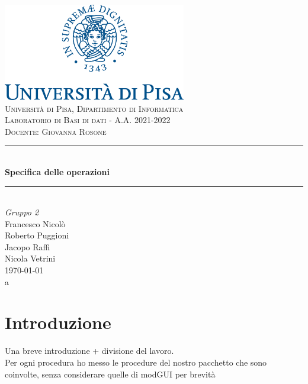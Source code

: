 \documentclass[a4paper,11pt]{article}
\newcommand{\HRule}{\rule{\linewidth}{0.5mm}} 	%
\begin{document}
\begin{titlepage}
\center
\includegraphics[width=0.6\textwidth]{img/unipi-logo.png}\\[1cm]

\textsc{\LARGE Università di Pisa, Dipartimento di Informatica}\\[1cm]

\textsc{\Large Laboratorio di Basi di dati - A.A. 2021-2022}\\[0.2cm]
\textsc{\large Docente: Giovanna Rosone}\\[1cm]

\HRule \\[0.8cm]
{ \huge \bfseries Specifica delle operazioni}\\[0.7cm]
\HRule \\[2cm]

\Huge \emph{Gruppo 2}\\[0.5cm]
\large Francesco Nicolò\\Roberto Puggioni\\Jacopo Raffi\\Nicola Vetrini\\[1.5cm]
{\large \today}\\[5cm]

\vfill
a\end{titlepage}

\newpage
\tableofcontents
\newpage

\section{Introduzione}
Una breve introduzione + divisione del lavoro. \\
Per ogni procedura ho messo le procedure del nostro pacchetto che sono coinvolte, senza
considerare quelle di modGUI per brevità


\newpage


\newpage


\end{document}
